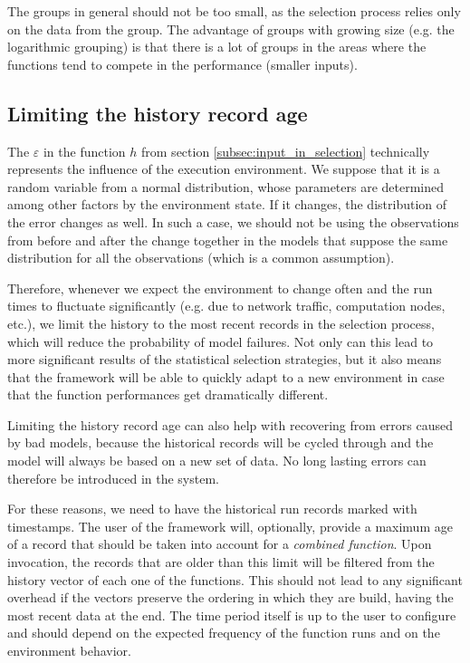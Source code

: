 The groups in general should not be too small, as the selection process relies only on the data from the group. The advantage of groups with growing size (e.g. the logarithmic grouping) is that there is a lot of groups in the areas where the functions tend to compete in the performance (smaller inputs).

\subsection{Limiting the history record age}
\label{subsec:limiting_record_age}

The $\varepsilon$ in the function $h$ from section \ref{subsec:input_in_selection} technically represents the influence of the execution environment. We suppose that it is a random variable from a normal distribution, whose parameters are determined among other factors by the environment state. If it changes, the distribution of the error changes as well. In such a case, we should not be using the observations from before and after the change together in the models that suppose the same distribution for all the observations (which is a common assumption).

Therefore, whenever we expect the environment to change often and the run times to fluctuate significantly (e.g. due to network traffic, computation nodes, etc.), we limit the history to the most recent records in the selection process, which will reduce the probability of model failures. Not only can this lead to more significant results of the statistical selection strategies, but it also means that the framework will be able to quickly adapt to a new environment in case that the function performances get dramatically different.

Limiting the history record age can also help with recovering from errors caused by bad models, because the historical records will be cycled through and the model will always be based on a new set of data. No long lasting errors can therefore be introduced in the system.

For these reasons, we need to have the historical run records marked with timestamps. The user of the framework will, optionally, provide a maximum age of a record that should be taken into account for a \textit{combined function}. Upon invocation, the records that are older than this limit will be filtered from the history vector of each one of the functions. This should not lead to any significant overhead if the vectors preserve the ordering in which they are build, having the most recent data at the end. The time period itself is up to the user to configure and should depend on the expected frequency of the function runs and on the environment behavior.

